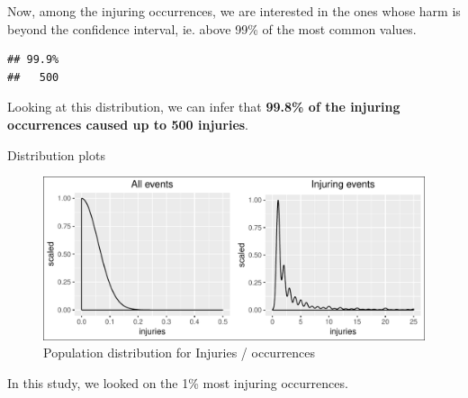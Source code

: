 Now, among the injuring occurrences, we are interested in the ones whose
harm is beyond the confidence interval, ie. above 99\% of the most
common values.

\begin{verbatim}
## 99.9% 
##   500
\end{verbatim}

Looking at this distribution, we can infer that \textbf{99.8\% of the
injuring occurrences caused up to 500 injuries}.

Distribution plots

\suppressfloats\begin{figure}[htbp]
\centering
\includegraphics{readme_files/figure-latex/inj-distribution-1.pdf}
\caption{Population distribution for Injuries / occurrences}
\end{figure}

In this study, we looked on the 1\% most injuring occurrences.

